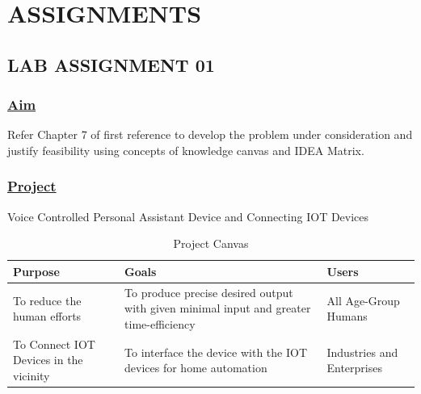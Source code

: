 
\chapter{ASSIGNMENTS}
\section*{\centering\LARGE{LAB ASSIGNMENT 01}}

\subsection*{\underline{Aim}}
Refer Chapter 7 of first reference to develop the problem under consideration and justify feasibility using concepts of knowledge canvas and IDEA Matrix. 
\subsection*{\underline{Project}}
Voice Controlled Personal Assistant Device and Connecting IOT Devices \\

\begin{table}[ht]
\caption{Project Canvas}
\begin{tabular}{ |p{5cm}|p{5cm}|p{5cm}|  }
 \hline
 \textbf{Purpose} & \textbf{Goals} & \textbf{Users}\\
 \hline
To reduce the human efforts & To produce precise desired output with given minimal input and greater time-efficiency & All Age-Group Humans\\

To Connect IOT Devices in the vicinity & To interface the device with the IOT devices for home automation & Industries and Enterprises \\
 
 \hline
 \end{tabular}
 \end{table}
 
